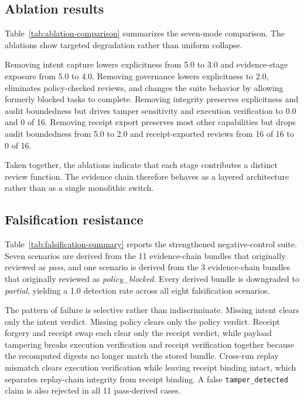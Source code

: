 \subsection{Ablation results}

Table~\ref{tab:ablation-comparison} summarizes the seven-mode comparison. The ablations show targeted degradation rather than uniform collapse.



Removing intent capture lowers explicitness from 5.0 to 3.0 and evidence-stage exposure from 5.0 to 4.0. Removing governance lowers explicitness to 2.0, eliminates policy-checked reviews, and changes the suite behavior by allowing formerly blocked tasks to complete. Removing integrity preserves explicitness and audit boundedness but drives tamper sensitivity and execution verification to 0.0 and 0 of 16. Removing receipt export preserves most other capabilities but drops audit boundedness from 5.0 to 2.0 and receipt-exported reviews from 16 of 16 to 0 of 16.

Taken together, the ablations indicate that each stage contributes a distinct review function. The evidence chain therefore behaves as a layered architecture rather than as a single monolithic switch.

\subsection{Falsification resistance}

Table~\ref{tab:falsification-summary} reports the strengthened negative-control suite. Seven scenarios are derived from the 11 evidence-chain bundles that originally reviewed as \emph{pass}, and one scenario is derived from the 3 evidence-chain bundles that originally reviewed as \emph{policy\_blocked}. Every derived bundle is downgraded to \emph{partial}, yielding a 1.0 detection rate across all eight falsification scenarios.



The pattern of failure is selective rather than indiscriminate. Missing intent clears only the intent verdict. Missing policy clears only the policy verdict. Receipt forgery and receipt swap each clear only the receipt verdict, while payload tampering breaks execution verification and receipt verification together because the recomputed digests no longer match the stored bundle. Cross-run replay mismatch clears execution verification while leaving receipt binding intact, which separates replay-chain integrity from receipt binding. A false \texttt{tamper\_detected} claim is also rejected in all 11 pass-derived cases.

